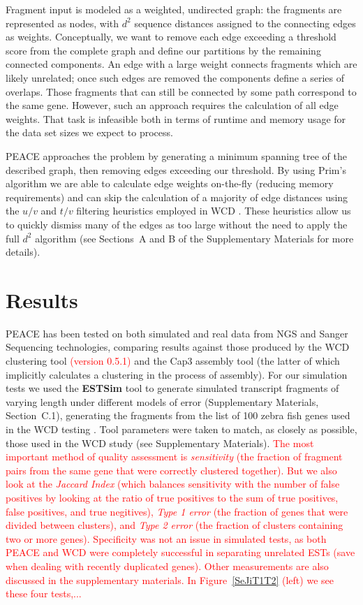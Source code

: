 \documentclass[a4,center,fleqn]{NAR}
\newcommand{\mc}[1]{\textcolor{red}{#1}}
\newcommand{\peace} {{\small PEACE}}
\newcommand{\wcd} {{\small WCD}}
\newcommand{\capthree} {{\small Cap3}}
\begin{document}
Fragment input is modeled as a weighted, undirected graph: the
fragments are represented as nodes, with $d^2$ sequence distances
assigned to the connecting edges as weights.  Conceptually, we want to
remove each edge exceeding a threshold score from the complete graph
and define our partitions by the remaining connected components.  An
edge with a large weight connects fragments which are likely
unrelated; once such edges are removed the components define a series
of overlaps.  Those fragments that can still be connected by some path
correspond to the same gene.  However, such an approach requires the
calculation of all edge weights.  That task is infeasible both in terms
of runtime and memory usage for the data set sizes we expect to process.

\peace\/ approaches the problem by generating a minimum spanning tree of the
described graph, then removing edges exceeding our threshold.  By
using Prim's algorithm we are able to calculate edge weights
on-the-fly (reducing memory requirements) and can skip the
calculation of a majority of edge distances using the $u/v$ and $t/v$
filtering heuristics employed in \wcd\/ \cite{Hazelhurst08a}.
These heuristics allow us to quickly dismiss many of the edges as too
large without the need to apply the full $d^2$ algorithm (see
Sections~A and B of the Supplementary Materials for more details). 

\section{Results}

\peace\/ has been tested on both simulated and real data from NGS and
Sanger Sequencing technologies, comparing results against those
produced by the \wcd\/ clustering tool \mc{(version
  0.5.1)}\cite{Hazelhurst08a} and the \capthree\/ assembly tool
\cite{Huang99} (the latter of which implicitly calculates a clustering
in the process of assembly).  For our simulation tests we used the
{\bf ESTSim} tool \cite{Hazelhurst03} to generate simulated transcript
fragments of varying length under different models of error
(Supplementary Materials, Section~C.1), generating the fragments from
the list of 100 zebra fish genes used in the \wcd\/ testing
\cite{Hazelhurst08a}.  Tool parameters were taken to match, as closely
as possible, those used in the \wcd\/ study (see Supplementary
Materials).  \mc{The most important method of quality assessment is
  {\it sensitivity} (the fraction of fragment pairs from the same gene
  that were correctly clustered together).  But we also look at the
  {\it Jaccard Index} (which balances sensitivity with the number of
  false positives by looking at the ratio of true positives to the sum
  of true positives, false positives, and true negitives), {\it Type 1
    error} (the fraction of genes that were divided between clusters),
  and {\it Type 2 error} (the fraction of clusters containing two or
  more genes).  Specificity was not an issue in simulated tests, as
  both \peace\/ and \wcd\/ were completely successful in separating
  unrelated ESTs (save when dealing with recently duplicated genes).
  Other measurements are also discussed in the supplementary
  materials.  In Figure~\ref{SeJiT1T2} (left) we see these four tests,...}
\end{document}
